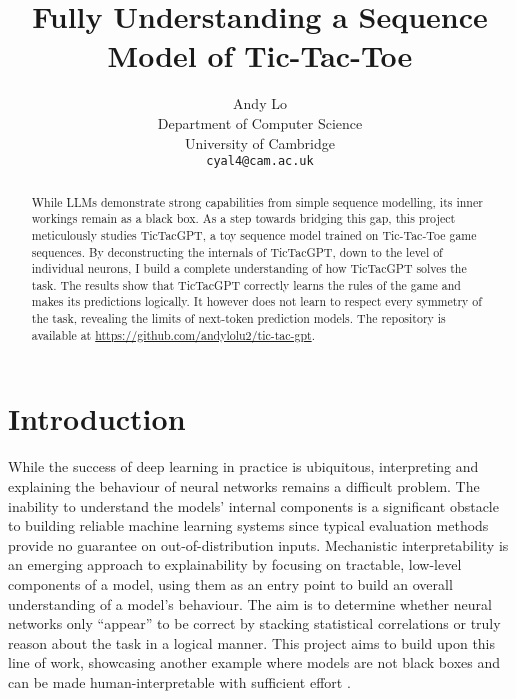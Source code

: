 \documentclass{article}
\title{Fully Understanding a Sequence Model of Tic-Tac-Toe}
\author{%
  Andy Lo \\
  Department of Computer Science\\
  University of Cambridge\\
  \texttt{cyal4@cam.ac.uk} \\
}
\newcommand{\ttgpt}{TicTacGPT\xspace}
\newcommand{\ttt}{Tic-Tac-Toe\xspace}
\begin{document}
\begin{acronym}
\end{acronym}


\maketitle


\begin{abstract}
    While \ac{LLMs} demonstrate strong capabilities from simple sequence modelling, its inner workings remain as a black box. As a step towards bridging this gap, this project meticulously studies \ttgpt, a toy sequence model trained on \ttt game sequences. By deconstructing the internals of \ttgpt, down to the level of individual neurons, I build a complete understanding of how \ttgpt solves the task. The results show that \ttgpt correctly learns the rules of the game and makes its predictions logically. It however does not learn to respect every symmetry of the task, revealing the limits of next-token prediction models. The repository is available at \url{https://github.com/andylolu2/tic-tac-gpt}.
\end{abstract}


\section{Introduction}

While the success of deep learning in practice is ubiquitous, interpreting and explaining the behaviour of neural networks remains a difficult problem. The inability to understand the models' internal components is a significant obstacle to building reliable machine learning systems since typical evaluation methods provide no guarantee on out-of-distribution inputs. Mechanistic interpretability is an emerging approach to explainability by focusing on tractable, low-level components of a model, using them as an entry point to build an overall understanding of a model's behaviour. The aim is to determine whether neural networks only ``appear'' to be correct by stacking statistical correlations or truly reason about the task in a logical manner. This project aims to build upon this line of work, showcasing another example where models are not black boxes and can be made human-interpretable with sufficient effort \cite{nanda2023progress,tigges2023linear,heimersheim2023circuit}.
\end{document}
